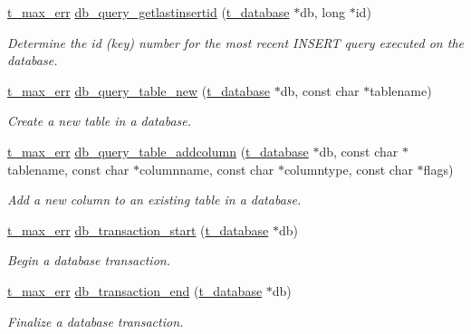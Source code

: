 \begin{DoxyCompactItemize}
\hyperlink{group__datatypes_ga73edaae82b318855cc09fac994918165}{t\_\-max\_\-err} \hyperlink{group__database_ga534b71af369d49827855be8f07cc09bc}{db\_\-query\_\-getlastinsertid} (\hyperlink{structt__object}{t\_\-database} $\ast$db, long $\ast$id)
\begin{DoxyCompactList}\small\item\em Determine the id (key) number for the most recent INSERT query executed on the database. \item\end{DoxyCompactList}\item 
\hyperlink{group__datatypes_ga73edaae82b318855cc09fac994918165}{t\_\-max\_\-err} \hyperlink{group__database_ga79e6ee7b7d344b372314d08b1b19fa8d}{db\_\-query\_\-table\_\-new} (\hyperlink{structt__object}{t\_\-database} $\ast$db, const char $\ast$tablename)
\begin{DoxyCompactList}\small\item\em Create a new table in a database. \item\end{DoxyCompactList}\item 
\hyperlink{group__datatypes_ga73edaae82b318855cc09fac994918165}{t\_\-max\_\-err} \hyperlink{group__database_gaafcaffcf5fea4ded0d474e1332b8a922}{db\_\-query\_\-table\_\-addcolumn} (\hyperlink{structt__object}{t\_\-database} $\ast$db, const char $\ast$tablename, const char $\ast$columnname, const char $\ast$columntype, const char $\ast$flags)
\begin{DoxyCompactList}\small\item\em Add a new column to an existing table in a database. \item\end{DoxyCompactList}\item 
\hyperlink{group__datatypes_ga73edaae82b318855cc09fac994918165}{t\_\-max\_\-err} \hyperlink{group__database_gad14964ae056aa663646f3fc3081b3b3a}{db\_\-transaction\_\-start} (\hyperlink{structt__object}{t\_\-database} $\ast$db)
\begin{DoxyCompactList}\small\item\em Begin a database transaction. \item\end{DoxyCompactList}\item 
\hyperlink{group__datatypes_ga73edaae82b318855cc09fac994918165}{t\_\-max\_\-err} \hyperlink{group__database_ga03a64b223d17437a2a7eb976025b5874}{db\_\-transaction\_\-end} (\hyperlink{structt__object}{t\_\-database} $\ast$db)
\begin{DoxyCompactList}\small\item\em Finalize a database transaction. \item\end{DoxyCompactList}\item 

\end{DoxyCompactItemize}
